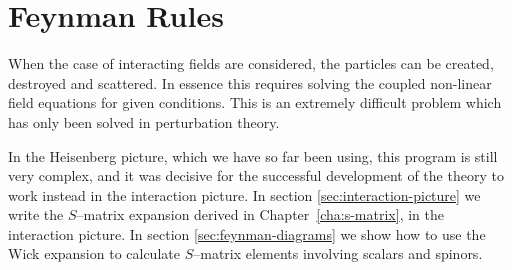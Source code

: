 \chapter{Feynman Rules}
\label{chap:fr} %

When the case of interacting fields are considered, the particles can be created, destroyed and scattered. In essence this requires solving the coupled non-linear field equations for given conditions. This is an extremely difficult problem which has only been solved in perturbation theory.

In the Heisenberg picture, which we have so far been using, this program is still very complex, and it was decisive for the successful development of the theory to work instead in the interaction picture. In section \ref{sec:interaction-picture} we write the $S$--matrix expansion derived in Chapter~\ref{cha:s-matrix}, in the interaction picture. In section \ref{sec:feynman-diagrams} we show how to use the Wick expansion to calculate $S$--matrix elements involving scalars and spinors.

